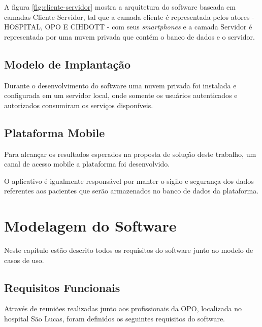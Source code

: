 \documentclass[portuguese,oneside]{tcc}
\begin{document}
A figura \ref{fig:cliente-servidor} mostra a arquitetura do software baseada em camadas Cliente-Servidor, tal que a camada cliente é representada pelos atores - HOSPITAL, OPO E CIHDOTT - com seus \textit{smartphones} e a camada Servidor é representada por uma nuvem privada que contém o banco de dados e o servidor.


\section{Modelo de Implantação}
Durante o desenvolvimento do software uma nuvem privada foi instalada e configurada em um servidor local, onde somente os usuários autenticados e autorizados consumiram os serviços disponíveis.

\section{Plataforma Mobile}

Para alcançar os resultados esperados na proposta de solução deste trabalho, um canal de acesso mobile a plataforma foi desenvolvido.
 

O aplicativo é igualmente responsável por manter o sigilo e segurança dos dados referentes aos pacientes que serão armazenados no banco de dados da plataforma.

\chapter{Modelagem do Software}
Neste capítulo estão descrito todos os requisitos do software junto ao modelo de casos de uso.

\section{Requisitos Funcionais}
Através de reuniões realizadas junto aos profissionais da OPO, localizada no hospital São Lucas, foram definidos os seguintes requisitos do software.
\end{document}
